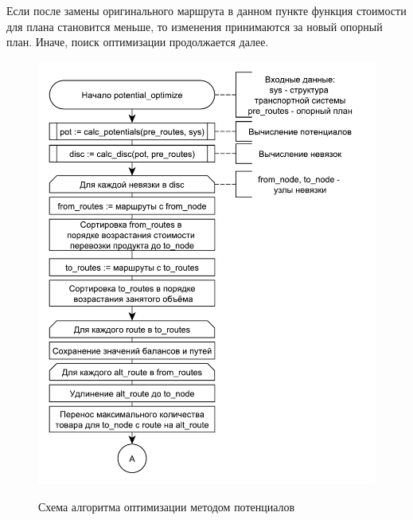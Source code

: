 Если после замены оригинального маршрута в данном пункте функция стоимости для плана становится меньше, то изменения принимаются за новый опорный план. Иначе, поиск оптимизации продолжается далее.

\begin{figure}[h]
	\begin{center}
		{\includegraphics[scale=0.7, angle=0, page=1]{img/potential_optimize_1.pdf}}
		\caption{Схема алгоритма оптимизации методом потенциалов}
		\label{alg:potential_1}
	\end{center}
\end{figure}

